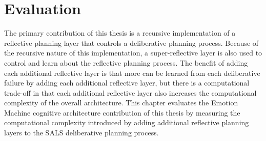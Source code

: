 \chapter{Evaluation}
\label{chapter:evaluation}

The primary contribution of this thesis is a recursive implementation
of a reflective planning layer that controls a deliberative planning
process.  Because of the recursive nature of this implementation, a
super-reflective layer is also used to control and learn about the
reflective planning process.  The benefit of adding each additional
reflective layer is that more can be learned from each deliberative
failure by adding each additional reflective layer, but there is a
computational trade-off in that each additional reflective layer also
increases the computational complexity of the overall architecture.
This chapter evaluates the Emotion Machine cognitive architecture
contribution of this thesis by measuring the computational complexity
introduced by adding additional reflective planning layers to the SALS
deliberative planning process.

